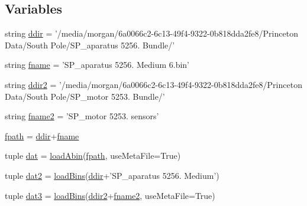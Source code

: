 \subsection*{Variables}
\begin{DoxyCompactItemize}
\item 
string \hyperlink{namespacerepo_1_1programs_1_1pythonpackages_1_1pr_1_1openMotor_ab3fcb2684f3321af9bd6715fa1c12675}{ddir} = '/media/morgan/6a0066c2-\/6c13-\/49f4-\/9322-\/0b818dda2fe8/\-Princeton Data/\-South Pole/\-S\-P\-\_\-aparatus 5256. Bundle/'
\item 
string \hyperlink{namespacerepo_1_1programs_1_1pythonpackages_1_1pr_1_1openMotor_a1ca6afbef052898575edbdf81a19cce4}{fname} = 'S\-P\-\_\-aparatus 5256. Medium 6.bin'
\item 
string \hyperlink{namespacerepo_1_1programs_1_1pythonpackages_1_1pr_1_1openMotor_a7845f46665131b51ba25ba3adfaf4958}{ddir2} = '/media/morgan/6a0066c2-\/6c13-\/49f4-\/9322-\/0b818dda2fe8/\-Princeton Data/\-South Pole/\-S\-P\-\_\-motor 5253. Bundle/'
\item 
string \hyperlink{namespacerepo_1_1programs_1_1pythonpackages_1_1pr_1_1openMotor_ab3194f8b875a45048365db97cf0d0fd0}{fname2} = 'S\-P\-\_\-motor 5253. sensors'
\item 
\hyperlink{namespacerepo_1_1programs_1_1pythonpackages_1_1pr_1_1openMotor_aa622e663d644f1b366ed96d4f2b34cf2}{fpath} = \hyperlink{namespacerepo_1_1programs_1_1pythonpackages_1_1pr_1_1openMotor_ab3fcb2684f3321af9bd6715fa1c12675}{ddir}+\hyperlink{namespacerepo_1_1programs_1_1pythonpackages_1_1pr_1_1openMotor_a1ca6afbef052898575edbdf81a19cce4}{fname}
\item 
tuple \hyperlink{namespacerepo_1_1programs_1_1pythonpackages_1_1pr_1_1openMotor_aba6f1fba127e2142e12df0163a37f98c}{dat} = \hyperlink{namespacerepo_1_1programs_1_1pythonpackages_1_1pr_1_1openMotor_a04420d495757844bca7113b696a2cb1d}{load\-Abin}(\hyperlink{namespacerepo_1_1programs_1_1pythonpackages_1_1pr_1_1openMotor_aa622e663d644f1b366ed96d4f2b34cf2}{fpath}, use\-Meta\-File=True)
\item 
tuple \hyperlink{namespacerepo_1_1programs_1_1pythonpackages_1_1pr_1_1openMotor_a7e71c31c6f2be1f7dd4c5818fbc3b12e}{dat2} = \hyperlink{namespacerepo_1_1programs_1_1pythonpackages_1_1pr_1_1openMotor_a67f554beaac0864d301fab58bf86397b}{load\-Bins}(\hyperlink{namespacerepo_1_1programs_1_1pythonpackages_1_1pr_1_1openMotor_ab3fcb2684f3321af9bd6715fa1c12675}{ddir}+'S\-P\-\_\-aparatus 5256. Medium')
\item 
tuple \hyperlink{namespacerepo_1_1programs_1_1pythonpackages_1_1pr_1_1openMotor_a7e9dd8e353fa85c7c0ecdda03da8d64e}{dat3} = \hyperlink{namespacerepo_1_1programs_1_1pythonpackages_1_1pr_1_1openMotor_a67f554beaac0864d301fab58bf86397b}{load\-Bins}(\hyperlink{namespacerepo_1_1programs_1_1pythonpackages_1_1pr_1_1openMotor_a7845f46665131b51ba25ba3adfaf4958}{ddir2}+\hyperlink{namespacerepo_1_1programs_1_1pythonpackages_1_1pr_1_1openMotor_ab3194f8b875a45048365db97cf0d0fd0}{fname2}, use\-Meta\-File=True)
\end{DoxyCompactItemize}


